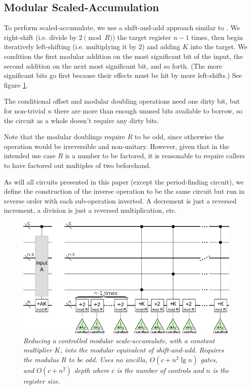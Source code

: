 \documentclass[twocolumn]{article}
\begin{document}
\subsection{Modular Scaled-Accumulation}

To perform scaled-accumulate, we use a shift-and-add approach similar to \cite{beauregard2003}.
We right-shift (i.e. divide by $2 {\pmod R}$) the target register $n-1$ times, then begin iteratively left-shifting (i.e. multiplying it by 2) and adding $K$ into the target.
We condition the first modular addition on the most significant bit of the input, the second addition on the next most significant bit, and so forth.
(The more significant bits go first because their effects must be hit by more left-shifts.)
See figure \ref{fig:controlled-modular-scale-accumulate}.

The conditional offset and modular doubling operations need one dirty bit, but for non-trivial $n$ there are more than enough unused bits available to borrow, so the circuit as a whole doesn't require any dirty bits.

Note that the modular doublings require $R$ to be odd, since otherwise the operation would be irreversible and non-unitary.
However, given that in the intended use case $R$ is a number to be factored, it is reasonable to require callers to have factored out multiples of two beforehand.

As will all circuits presented in this paper (except the period-finding circuit), we define the construction of the inverse operation to be the same circuit but run in reverse order with each sub-operation inverted.
A decrement is just a reversed increment, a division is just a reversed multiplication, etc.

\begin{figure}
  \centering
  \includegraphics[width=\linewidth]{assets/controlled-modular-multiply-accumulate.png}
  \caption{\em
    Reducing a controlled modular scale-accumulate, with a constant multiplier $K$, into the modular equivalent of shift-and-add.
    Requires the modulus $R$ to be odd.
    Uses no ancilla, $O(c + n^2 \lg n)$ gates, and $O(c + n^2)$ depth where $c$ is the number of controls and $n$ is the register size.
  }
  \label{fig:controlled-modular-scale-accumulate}
\end{figure}
\end{document}
